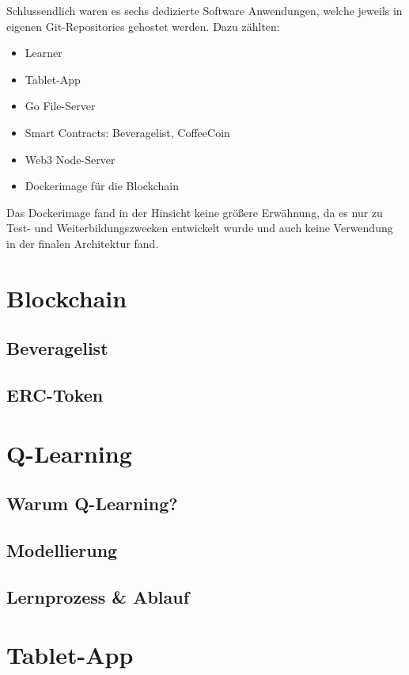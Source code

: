 Schlussendlich waren es sechs dedizierte Software Anwendungen, welche jeweils in eigenen Git-Repositories gehostet werden. 
Dazu zählten:
\begin{itemize}
	\item Learner
	\item Tablet-App
	\item Go File-Server
	\item Smart Contracts: Beveragelist, CoffeeCoin
	\item Web3 Node-Server
	\item Dockerimage für die Blockchain
\end{itemize} 
Das Dockerimage fand in der Hinsicht keine größere Erwähnung, da es nur zu Test- und Weiterbildungszwecken entwickelt wurde und auch keine Verwendung in der finalen Architektur fand.


\section{Blockchain}
\subsection{Beveragelist}
\subsection{ERC-Token}

\section{Q-Learning}
\subsection{Warum Q-Learning?}
\subsection{Modellierung}
\subsection{Lernprozess \& Ablauf}

\section{Tablet-App}